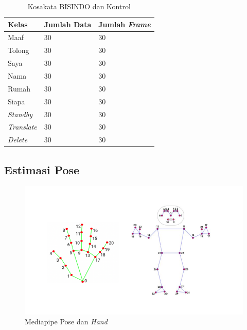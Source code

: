 \begin{table}[H]
  \caption{Kosakata BISINDO dan Kontrol}
  \label{tb:kosakataBISINDO}
  \centering
  \begin{tabular}{lll}
    \toprule
    \textbf{Kelas} & \textbf{Jumlah Data} & \textbf{Jumlah \emph{Frame}} \\
    \midrule
    Maaf                        & 30            & 30 \\
    Tolong                      & 30            & 30 \\
    Saya                        & 30            & 30 \\
    Nama                        & 30            & 30 \\
    Rumah                       & 30            & 30 \\
    Siapa                       & 30            & 30 \\
    \textit{Standby}                       & 30             & 30 \\
    \textit{Translate}                     & 30             & 30 \\
    \textit{Delete}                        & 30             & 30 \\
    \bottomrule
  \end{tabular}
\end{table}


\subsection{Estimasi Pose}
\label{subsec:estimasipose}

\begin{figure}[ht]
  \centering

  \includegraphics[scale=0.3]{gambar/bab3-pose-combine.png}

  \caption{Mediapipe Pose dan \emph{Hand}}
  \label{fig:estimasipose}
\end{figure}


